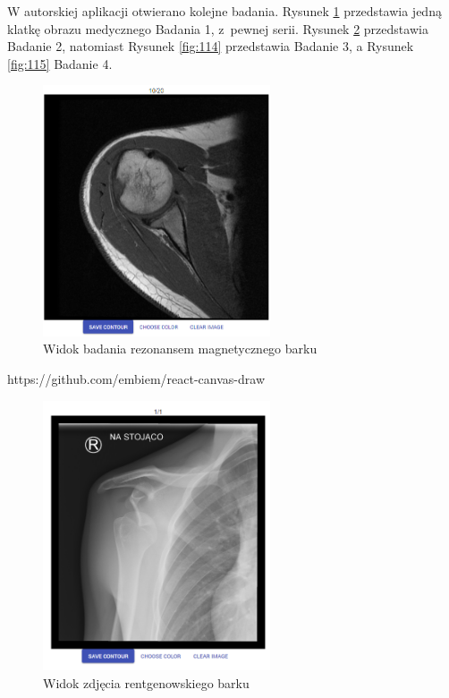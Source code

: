 \documentclass[a4paper,11pt,twoside,openright]{report}
\theoremstyle{definition}
\begin{document}
W autorskiej aplikacji otwierano kolejne badania. Rysunek \ref{fig:112} przedstawia
jedną klatkę obrazu medycznego Badania 1, z~pewnej serii. Rysunek \ref{fig:113}
przedstawia Badanie 2, natomiast Rysunek \ref{fig:114} przedstawia Badanie 3, a
Rysunek \ref{fig:115} Badanie 4.

\begin{figure}[p]
	\center
	\includegraphics[width=0.6\textwidth]{112}
	\caption{Widok badania rezonansem magnetycznego barku}
    	\label{fig:112}
\end{figure}https://github.com/embiem/react-canvas-draw

\begin{figure}[p]
	\center
	\includegraphics[width=0.6\textwidth]{113}
	\caption{Widok zdjęcia rentgenowskiego barku}
    	\label{fig:113}
\end{figure}
\end{document}
